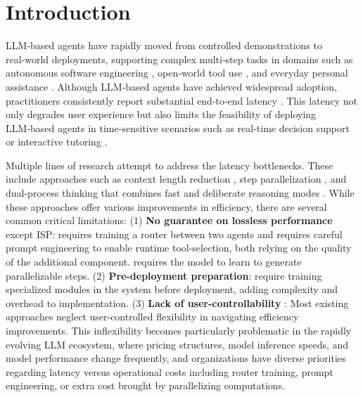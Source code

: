 \section{Introduction}
LLM‑based agents have rapidly moved from controlled demonstrations to real‑world deployments, supporting complex multi‑step tasks in domains such as autonomous software engineering \citep{wu2023autogen}, open‑world tool use \citep{shen2024hugginggpt}, and everyday personal assistance \citep{ge2024openagi}. Although LLM‑based agents have achieved widespread adoption, practitioners consistently report substantial end‑to‑end latency \citep{hua2024interactive, zhang2024ecoact, zhang2023ecoassistant, saha2024system}. This latency not only degrades user experience but also limits the feasibility of deploying LLM‑based agents in time‑sensitive scenarios such as real‑time decision support \citep{cai2025rtbagent} or interactive tutoring \citep{modran2024llm, piro2024mylearningtalk}.

Multiple lines of research attempt to address the latency bottlenecks. These include approaches such as context length reduction \citep{zhang2024ecoact}, step parallelization \citep{hua2024interactive, li2025parallelized, pan2025learning}, and dual-process thinking that combines fast and deliberate reasoning modes \citep{saha2024system, lin2023swiftsage, christakopoulou2024agents}. While these approaches offer various improvements in efficiency, there are several common critical limitations: (1) \textbf{No guarantee on lossless performance} except ISP: \cite{saha2024system} requires training a router between two agents and \cite{zhang2024ecoact} requires careful prompt engineering to enable runtime tool-selection, both relying on the quality of the additional component. \cite{pan2025learning} requires the model to learn to generate parallelizable steps. (2) \textbf{Pre-deployment preparation}: \cite{saha2024system, pan2025learning} require training specialized modules in the system before deployment, adding complexity and overhead to implementation. (3) \textbf{Lack of user-controllability} \citep{kiefer2017controllability}: Most existing approaches neglect user-controlled flexibility in navigating efficiency improvements. This inflexibility becomes particularly problematic in the rapidly evolving LLM ecosystem, where pricing structures, model inference speeds, and model performance change frequently, and organizations have diverse priorities regarding latency versus operational costs including router training, prompt engineering, or extra cost brought by parallelizing computations.


